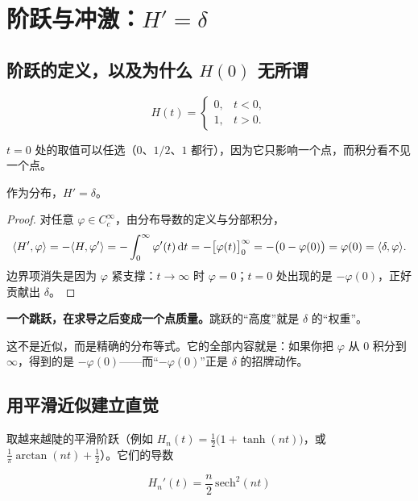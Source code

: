 \section{阶跃与冲激：$H'=\delta$}

\subsection{阶跃的定义，以及为什么 $H(0)$ 无所谓}

\begin{equation}
H(t)=\begin{cases}0,&t<0,\\[2pt] 1,&t>0.\end{cases}
\end{equation}

$t=0$ 处的取值可以任选（$0$、$1/2$、$1$ 都行），因为它只影响一个点，而积分看不见一个点。

\begin{prop}\label{prop:Hprime}
作为分布，$H'=\delta$。
\end{prop}

\begin{proof}
对任意 $\varphi\in C_c^{\infty}$，由分布导数的定义与分部积分，
\begin{equation}
\langle H',\varphi\rangle
=-\langle H,\varphi'\rangle
=-\int_{0}^{\infty}\varphi'(t)\mathop{}\!\mathrm{d} t
=-\big[\varphi(t)\big]_{0}^{\infty}
=-\big(0-\varphi(0)\big)=\varphi(0)=\langle \delta,\varphi\rangle .
\end{equation}
边界项消失是因为 $\varphi$ 紧支撑：$t\to\infty$ 时 $\varphi=0$；$t=0$ 处出现的是 $-\varphi(0)$，正好贡献出 $\delta$。
\end{proof}

\begin{ideabox}[这段证明在讲什么]
\textbf{一个跳跃，在求导之后变成一个点质量。}跳跃的“高度”就是 $\delta$ 的“权重”。

这不是近似，而是精确的分布等式。它的全部内容就是：如果你把 $\varphi$ 从 $0$ 积分到 $\infty$，得到的是 $-\varphi(0)$——而“$-\varphi(0)$”正是 $\delta$ 的招牌动作。
\end{ideabox}

\subsection{用平滑近似建立直觉}

取越来越陡的平滑阶跃（例如 $H_n(t)=\frac{1}{2}\big(1+\tanh(nt)\big)$，或 $\frac{1}{\pi}\arctan(nt)+\frac12$）。它们的导数

\begin{equation}
H_n'(t)=\frac{n}{2}\,\mathrm{sech}^{2}(nt)
\end{equation}

